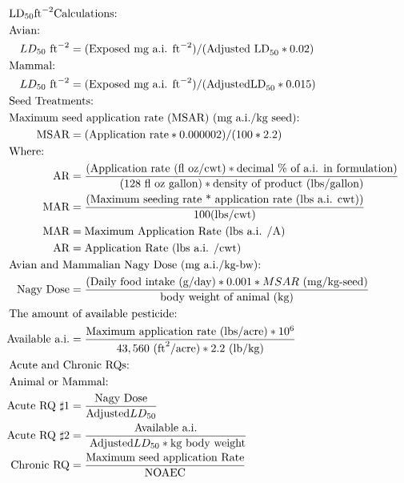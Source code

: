 \documentclass[10pt]{article}
\begin{document}
\begin{align*}
& \hspace{-0.75in}  \text{LD}_{50}\text{ft}^{-2}\text{Calculations:} \nonumber \\
& \hspace{-0.75in} \text{Avian:}\\
LD_{50} \text{ ft}^{-2} & = (\text{Exposed mg a.i. ft}^{-2}) / (\text{Adjusted LD}_{50}*0.02)\\
& \hspace{-0.75in} \text{Mammal:}\\
LD_{50} \text{ ft}^{-2} & =(\text{Exposed mg a.i. ft}^{-2}) / (\text{AdjustedLD}_{50}*0.015)\\
& \hspace{-0.75in} \text{Seed Treatments:}\\
& \hspace{-0.75in} \text{Maximum seed application rate (MSAR) (mg a.i./kg seed):}\\  
\text{MSAR} & = (\text{Application rate} *  0.000002) / (100 * 2.2)\\
& \hspace{-0.75in} \text{Where:}\\
\text{AR} & = \frac{\text{(Application rate (fl oz/cwt)} * \text{decimal \% of a.i. in formulation)}}{(128 \text{ fl oz gallon)} * \text{density of product (lbs/gallon)}}\\
\text{MAR} & = \frac{\text{(Maximum seeding rate * application rate (lbs a.i. cwt))}}{ 100 \text{(lbs/cwt)}}\\
\text{MAR} & = \text{Maximum Application Rate (lbs a.i. /A)}\\
\text{AR} & = \text{Application Rate (lbs a.i. /cwt)}\\
& \hspace{-0.75in} \text{Avian and Mammalian Nagy Dose (mg a.i./kg-bw):}\\
\text{Nagy Dose} & = \frac{\text{(Daily food intake (g/day)} * 0.001 * MSAR\text{ (mg/kg-seed)}}{\text{body weight of animal (kg)}}\\
& \hspace{-0.75in}  \text{The amount of available pesticide:}\\
\text{Available a.i.} & = \frac{\text{Maximum application rate (lbs/acre)} * 10^{6}}{43,560 \text{ (ft}^{2}\text{/acre}) * 2.2 \text{ (lb/kg)}}\\
& \hspace{-0.75in}  \text{Acute and Chronic RQs:}\\
& \hspace{-0.75in}  \text{Animal or Mammal:}\\
\text{Acute RQ } \sharp 1 & = \frac{\text{Nagy Dose}}{\text{Adjusted} LD_{50}}\\
\text{Acute RQ } \sharp 2 & = \frac{\text{Available a.i.}}{\text{ Adjusted} LD_{50} * \text{kg body weight}}\\
\text{Chronic RQ} & = \frac{\text{Maximum seed application Rate}}{\text{NOAEC}}\\
\end{align*}
\end{document}
